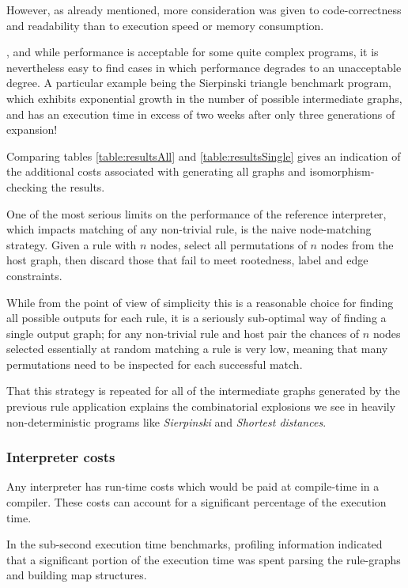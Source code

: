 However, as already mentioned, more consideration was given to code-correctness and readability than to execution speed or memory consumption.

, and while performance is acceptable for some quite complex programs, it is nevertheless easy to find cases in which performance degrades to an unacceptable degree. A particular example being the Sierpinski triangle benchmark program, which exhibits exponential growth in the number of possible intermediate graphs, and has an execution time in excess of two weeks after only three generations of expansion!

Comparing tables \ref{table:resultsAll} and \ref{table:resultsSingle} gives an indication of the additional costs associated with generating all graphs and isomorphism-checking the results.

One of the most serious limits on the performance of the reference interpreter, which impacts matching of any non-trivial rule, is the naive node-matching strategy. Given a rule with $n$ nodes, select all permutations of $n$ nodes from the host graph, then discard those that fail to meet rootedness, label and edge constraints.

While from the point of view of simplicity this is a reasonable choice for finding all possible outputs for each rule, it is a seriously sub-optimal way of finding a single output graph; for any non-trivial rule and host pair the chances of $n$ nodes selected essentially at random matching a rule is very low, meaning that many permutations need to be inspected for each successful match.

That this strategy is repeated for all of the intermediate graphs generated by the previous rule application explains the combinatorial explosions we see in heavily non-deterministic programs like \textit{Sierpinski} and \textit{Shortest distances}.

\subsubsection*{Interpreter costs}

Any interpreter has run-time costs which would be paid at compile-time in a compiler. These costs can account for a significant percentage of the execution time.

In the sub-second execution time benchmarks, profiling information indicated that a significant portion of the execution time was spent parsing the rule-graphs and building map structures.





